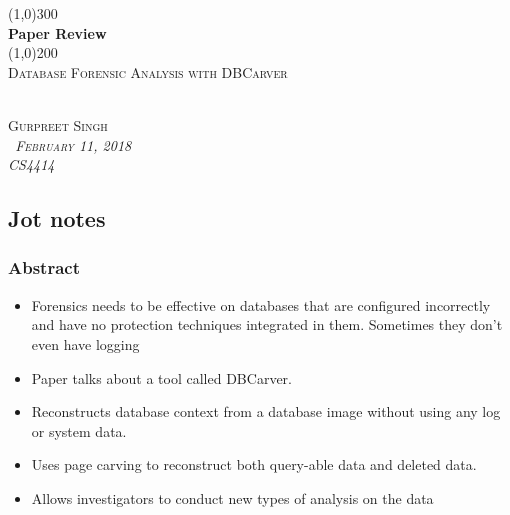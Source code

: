 \documentclass[11pt,]{article}
\providecommand{\tightlist}{%
  \setlength{\itemsep}{0pt}\setlength{\parskip}{0pt}}
\begin{document}
\doublespacing

\begin{titlepage}
    \begin{center}
    \line(1,0){300} \\ 
    [0.25in]
    \huge{\bfseries Paper Review} \\
    [2mm]
    \line(1,0){200} \\
    [1.5cm] 
    \textsc{\Large Database Forensic Analysis with DBCarver} \\
    [0.75cm]
    \textsc{\Large } \\
    [9cm]
    \end{center}
    
    \begin{flushright}
    \textsc{\Large{Gurpreet Singh \\}\normalsize\emph{\ February 11, 2018 \\}\normalsize\emph{CS4414 \\} }
    
    \end{flushright}
    
\end{titlepage}

\newpage

\hypertarget{jot-notes}{%
\subsection{Jot notes}\label{jot-notes}}

\hypertarget{abstract}{%
\subsubsection{Abstract}\label{abstract}}

\begin{itemize}
\tightlist
\item
  Forensics needs to be effective on databases that are configured
  incorrectly and have no protection techniques integrated in them.
  Sometimes they don't even have logging
\item
  Paper talks about a tool called DBCarver.
\item
  Reconstructs database context from a database image without using any
  log or system data.
\item
  Uses page carving to reconstruct both query-able data and deleted
  data.
\item
  Allows investigators to conduct new types of analysis on the data
\end{itemize}
\end{document}

